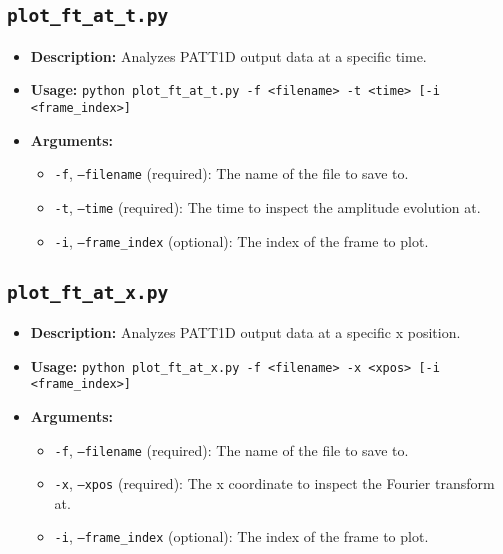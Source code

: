 \documentclass{article}
\begin{document}
\subsection{\texttt{plot\_ft\_at\_t.py}}
\begin{itemize}
    \item \textbf{Description:} Analyzes PATT1D output data at a specific time.
    \item \textbf{Usage:} \texttt{python plot\_ft\_at\_t.py -f <filename> -t <time> [-i <frame\_index>]}
    \item \textbf{Arguments:}
    \begin{itemize}
        \item \texttt{-f}, \texttt{--filename} (required): The name of the file to save to.
        \item \texttt{-t}, \texttt{--time} (required): The time to inspect the amplitude evolution at.
        \item \texttt{-i}, \texttt{--frame\_index} (optional): The index of the frame to plot.
    \end{itemize}
\end{itemize}

\subsection{\texttt{plot\_ft\_at\_x.py}}
\begin{itemize}
    \item \textbf{Description:} Analyzes PATT1D output data at a specific x position.
    \item \textbf{Usage:} \texttt{python plot\_ft\_at\_x.py -f <filename> -x <xpos> [-i <frame\_index>]}
    \item \textbf{Arguments:}
    \begin{itemize}
        \item \texttt{-f}, \texttt{--filename} (required): The name of the file to save to.
        \item \texttt{-x}, \texttt{--xpos} (required): The x coordinate to inspect the Fourier transform at.
        \item \texttt{-i}, \texttt{--frame\_index} (optional): The index of the frame to plot.
    \end{itemize}
\end{itemize}
\end{document}
